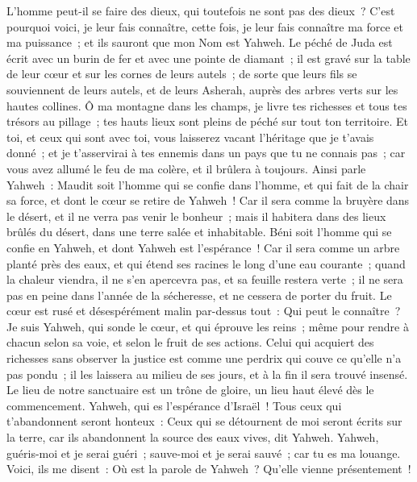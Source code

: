 \begin{multicols}{2}
L'homme peut-il se faire des dieux, qui toutefois ne sont pas des dieux~?
C'est pourquoi voici, je leur fais connaître, cette fois, je leur fais connaître ma force et ma puissance~; et ils sauront que mon Nom est Yahweh.
\VerseOne{}Le péché de Juda est écrit avec un burin de fer et avec une pointe de diamant~; il est gravé sur la table de leur cœur et sur les cornes de leurs autels~;
de sorte que leurs fils se souviennent de leurs autels, et de leurs Asherah, auprès des arbres verts sur les hautes collines.
Ô ma montagne dans les champs, je livre tes richesses et tous tes trésors au pillage~; tes hauts lieux sont pleins de péché sur tout ton territoire.
Et toi, et ceux qui sont avec toi, vous laisserez vacant l'héritage que je t'avais donné~; et je t'asservirai à tes ennemis dans un pays que tu ne connais pas~; car vous avez allumé le feu de ma colère, et il brûlera à toujours.
Ainsi parle Yahweh~: Maudit soit l'homme qui se confie dans l'homme, et qui fait de la chair sa force, et dont le cœur se retire de Yahweh~!
Car il sera comme la bruyère dans le désert, et il ne verra pas venir le bonheur~; mais il habitera dans des lieux brûlés du désert, dans une terre salée et inhabitable.
Béni soit l'homme qui se confie en Yahweh, et dont Yahweh est l'espérance~!
Car il sera comme un arbre planté près des eaux, et qui étend ses racines le long d'une eau courante~; quand la chaleur viendra, il ne s'en apercevra pas, et sa feuille restera verte~; il ne sera pas en peine dans l'année de la sécheresse, et ne cessera de porter du fruit.
Le cœur est rusé et désespérément malin par-dessus tout~: Qui peut le connaître~?
Je suis Yahweh, qui sonde le cœur, et qui éprouve les reins~; même pour rendre à chacun selon sa voie, et selon le fruit de ses actions.
Celui qui acquiert des richesses sans observer la justice est comme une perdrix qui couve ce qu'elle n'a pas pondu~; il les laissera au milieu de ses jours, et à la fin il sera trouvé insensé.
Le lieu de notre sanctuaire est un trône de gloire, un lieu haut élevé dès le commencement.
Yahweh, qui es l'espérance d'Israël~! Tous ceux qui t'abandonnent seront honteux~: Ceux qui se détournent de moi seront écrits sur la terre, car ils abandonnent la source des eaux vives, dit Yahweh.
Yahweh, guéris-moi et je serai guéri~; sauve-moi et je serai sauvé~; car tu es ma louange.
Voici, ils me disent~: Où est la parole de Yahweh~? Qu'elle vienne présentement~!

\end{multicols}
